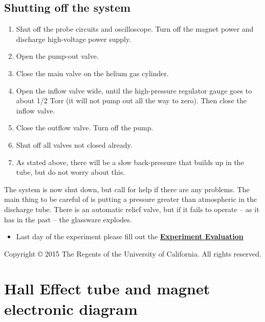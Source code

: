 \documentclass{../lab}
\begin{document}
\subsection{Shutting off the system}

\begin{enumerate}
    \item Shut off the probe circuits and oscilloscope. Turn off the magnet power and discharge high-voltage power supply.

    \item Open the pump-out valve.

    \item Close the main valve on the helium gas cylinder.

    \item Open the inflow valve wide, until the high-pressure regulator gauge goes to about 1/2 Torr (it will not pump out all the way to zero). Then close the inflow valve.

    \item Close the outflow valve. Turn off the pump.

    \item Shut off all valves not closed already.

    \item As stated above, there will be a slow back-pressure that builds up in the tube, but do not worry about this.
\end{enumerate}

\noindent The system is now shut down, but call for help if there are any problems. The main thing to be careful of is putting a pressure greater than atmospheric in the discharge tube. There is an automatic relief valve, but if it fails to operate -- as it has in the past -- the glassware explodes.

\begin{itemize}
    \item Last day of the experiment please fill out the \href{\ExperimentEvaluation}{\textbf{Experiment Evaluation}}
\end{itemize}

Copyright © 2015 The Regents of the University of California. All rights reserved.

\section{Hall Effect tube and magnet electronic diagram}
\end{document}
